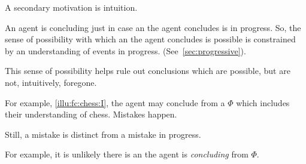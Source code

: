 \begin{note}
  A secondary motivation is intuition.

  An agent is concluding just in case an  the agent concludes is in progress.
  So, the sense of possibility with which an  the agent concludes is possible is constrained by an understanding of events in progress.
  (See~\autoref{sec:progressive}).

  This sense of possibility helps rule out conclusions which are possible, but are not, intuitively, foregone.

  For example, \autoref{illu:fc:chess:I}, the agent may conclude  from a \pool{} \(\Phi\) which includes their understanding of chess.
  Mistakes happen.

  Still, a mistake is distinct from a mistake in progress.

  For example, it is unlikely there is an  the agent is \emph{concluding}  from \(\Phi\).
\end{note}


